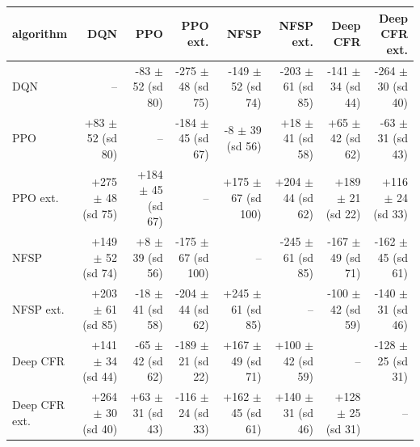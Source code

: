 \begin{tabular}{lrrrrrrr}
\toprule
algorithm & DQN & PPO & PPO ext. & NFSP & NFSP ext. & Deep CFR & Deep CFR ext. \\
\midrule
DQN & -- & -83 $\pm$ 52 (sd 80) & -275 $\pm$ 48 (sd 75) & -149 $\pm$ 52 (sd 74) & -203 $\pm$ 61 (sd 85) & -141 $\pm$ 34 (sd 44) & -264 $\pm$ 30 (sd 40) \\
PPO & +83 $\pm$ 52 (sd 80) & -- & -184 $\pm$ 45 (sd 67) & -8 $\pm$ 39 (sd 56) & +18 $\pm$ 41 (sd 58) & +65 $\pm$ 42 (sd 62) & -63 $\pm$ 31 (sd 43) \\
PPO ext. & +275 $\pm$ 48 (sd 75) & +184 $\pm$ 45 (sd 67) & -- & +175 $\pm$ 67 (sd 100) & +204 $\pm$ 44 (sd 62) & +189 $\pm$ 21 (sd 22) & +116 $\pm$ 24 (sd 33) \\
NFSP & +149 $\pm$ 52 (sd 74) & +8 $\pm$ 39 (sd 56) & -175 $\pm$ 67 (sd 100) & -- & -245 $\pm$ 61 (sd 85) & -167 $\pm$ 49 (sd 71) & -162 $\pm$ 45 (sd 61) \\
NFSP ext. & +203 $\pm$ 61 (sd 85) & -18 $\pm$ 41 (sd 58) & -204 $\pm$ 44 (sd 62) & +245 $\pm$ 61 (sd 85) & -- & -100 $\pm$ 42 (sd 59) & -140 $\pm$ 31 (sd 46) \\
Deep CFR & +141 $\pm$ 34 (sd 44) & -65 $\pm$ 42 (sd 62) & -189 $\pm$ 21 (sd 22) & +167 $\pm$ 49 (sd 71) & +100 $\pm$ 42 (sd 59) & -- & -128 $\pm$ 25 (sd 31) \\
Deep CFR ext. & +264 $\pm$ 30 (sd 40) & +63 $\pm$ 31 (sd 43) & -116 $\pm$ 24 (sd 33) & +162 $\pm$ 45 (sd 61) & +140 $\pm$ 31 (sd 46) & +128 $\pm$ 25 (sd 31) & -- \\
\bottomrule
\end{tabular}
